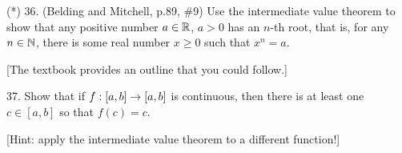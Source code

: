 \documentclass[12pt]{article}
\begin{document}
\begin{description}
\msk

\item{(*) 36.} (Belding and Mitchell, p.89, \#9) Use the intermediate value theorem 
to show that any positive number $a\in{\mathbb R}$, $a>0$
has an $n$-th root, that is, for any $n\in{\mathbb N}$, there is some real number $x\geq 0$ such
that $x^n=a$.

\ssk

\item{\spc} [The textbook provides an outline that you could follow.]

\msk

\item{37.} Show that if $f:[a,b]\rightarrow [a,b]$ is continuous, then there is 
at least one $c\in [a,b]$ so that $f(c)=c$.

\ssk

\item{\spc} [Hint: apply the intermediate value theorem to a different function!]

\msk


\end{description}
\vfill
\end{document}
